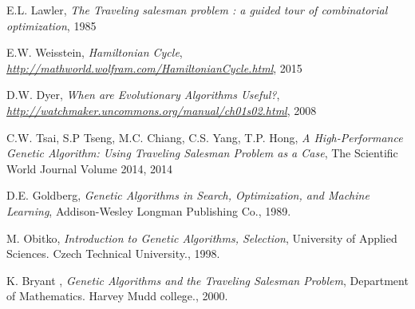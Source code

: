 \documentclass[article]{IEEEtran}
\begin{document}
\begin{thebibliography}{9}

E.L. Lawler, \textit{The Traveling salesman problem : a guided tour of combinatorial optimization},
1985

E.W. Weisstein, \textit{Hamiltonian Cycle},
\textit{\url{http://mathworld.wolfram.com/HamiltonianCycle.html}}, 2015

D.W. Dyer, \textit{When are Evolutionary Algorithms Useful?},
\textit{\url{http://watchmaker.uncommons.org/manual/ch01s02.html}}, 2008

C.W. Tsai, S.P Tseng, M.C. Chiang, C.S. Yang, T.P. Hong, \textit{A High-Performance Genetic Algorithm: Using Traveling Salesman Problem as a Case},
The Scientific World Journal Volume 2014, 2014

D.E. Goldberg, \textit{Genetic Algorithms in Search, Optimization, and Machine Learning},
Addison-Wesley Longman Publishing Co., 1989. 

M. Obitko, \textit{Introduction to Genetic Algorithms, Selection},
University of Applied Sciences. Czech Technical University., 1998. 

K. Bryant , \textit{Genetic Algorithms and the Traveling Salesman Problem},
Department of Mathematics. Harvey Mudd college., 2000. 

\end{thebibliography}
\end{document}
